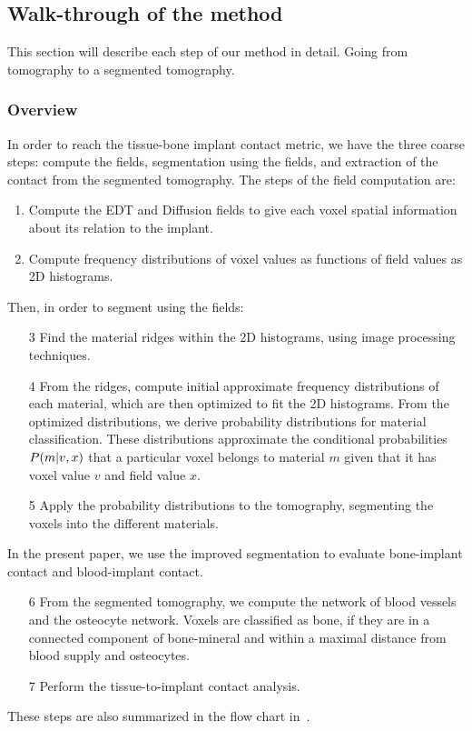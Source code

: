 \documentclass[pdflatex,sn-mathphys]{sn-jnl}%
\theoremstyle{thmstyleone}%
\theoremstyle{thmstyletwo}%
\theoremstyle{thmstylethree}%
\begin{document}

\subsection{Walk-through of the method}
This section will describe each step of our method in detail. Going from tomography to a segmented tomography.

\subsubsection{Overview}
In order to reach the tissue-bone implant contact metric, we have the three coarse steps: compute the fields, segmentation using the fields, and extraction of the contact from the segmented tomography.
%
The steps of the field computation are:
\begin{enumerate}
    \item Compute the EDT and Diffusion fields to give each voxel spatial information about its relation to the implant.
    \item Compute frequency distributions of voxel values as functions of field values as 2D histograms.
\end{enumerate}
%    
Then, in order to segment using the fields:
\begin{enumerate}
    \item[3] Find the material ridges within the 2D histograms, using image processing techniques.
    \item[4] From the ridges, compute initial approximate frequency distributions of each material, which are then optimized to fit the 2D histograms.
          From the optimized distributions, we derive probability distributions for material classification. These distributions approximate the conditional probabilities $P\!\left(m\middle\vert v,x\right)$ that a particular voxel belongs to material $m$ given that it has voxel value $v$ and field value $x$.
    \item[5] Apply the probability distributions to the tomography, segmenting the voxels into the different materials.
\end{enumerate}
%   
In the present paper, we use the improved segmentation to evaluate bone-implant contact and blood-implant contact.
\begin{enumerate}
\item[6] From the segmented tomography, we compute the network of blood vessels and the osteocyte network. Voxels are classified as bone, if they are in a connected component of bone-mineral and within a maximal distance from blood supply and osteocytes.
\item[7] Perform the tissue-to-implant contact analysis.
\end{enumerate}
%
These steps are also summarized in the flow chart in~.
\end{document}
